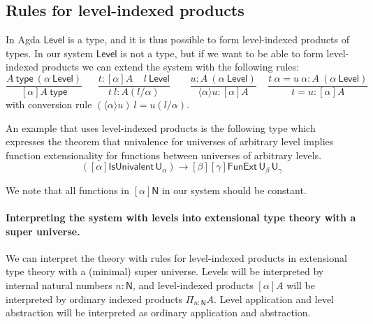 \documentclass[11pt,a4paper]{article}
\newcommand{\lam}[2]{{\langle}#1{\rangle}#2}
\def\NN{\mathsf{N}}
\def\UU{\mathsf{U}}
\def\Level{\mathsf{Level}}
\newcommand{\type}{\mathsf{type}}
\newcommand{\T}{\mathsf{T}}
\begin{document}
%
%
%
%
%
%
%

\subsection*{Rules for level-indexed products}

In Agda $\Level$ is a type, and it is thus possible to form level-indexed products of types. In our system $\Level$ is not a type, but if we want to be able to form level-indexed products we can extend the system with the following rules:
$$
\frac{A~\type~(\alpha~\Level)}{[\alpha]A~\type}~~~~~~~
\frac{t:[\alpha]A~~~~~l~\Level}
     {t~l:A(l/\alpha)}~~~~~~~~~
\frac{u:A~(\alpha~\Level)}{\lam{\alpha}{u}: [\alpha]A}~~~~~
\frac{t~\alpha = u~\alpha:A~(\alpha~\Level)}{t = u:[\alpha]A}
$$
with conversion rule $(\lam{\alpha}{u})~l = u(l/\alpha)$.

An example that uses level-indexed products is the following type which  expresses the theorem that univalence for universes of arbitrary level implies function extensionality for functions between universes of arbitrary levels.
$$
([\alpha]\mathsf{IsUnivalent}\, \UU_\alpha)
\to [\beta][\gamma] \mathsf{FunExt}\, \UU_\beta\, \UU_\gamma
$$   
               
We note that all functions in $[\alpha]\NN$ in our system
should be constant. 

\paragraph{Interpreting the system with levels into extensional type theory with a super universe.} We can interpret the theory with rules for level-indexed products in extensional type theory with a (minimal) super universe. Levels will be interpreted by internal natural numbers $n : \NN$, and level-indexed products $[\alpha]A$ will be interpreted by ordinary indexed products $\Pi_{n : \NN}A$. Level application and level abstraction will be interpreted as ordinary application and abstraction.
\end{document}
